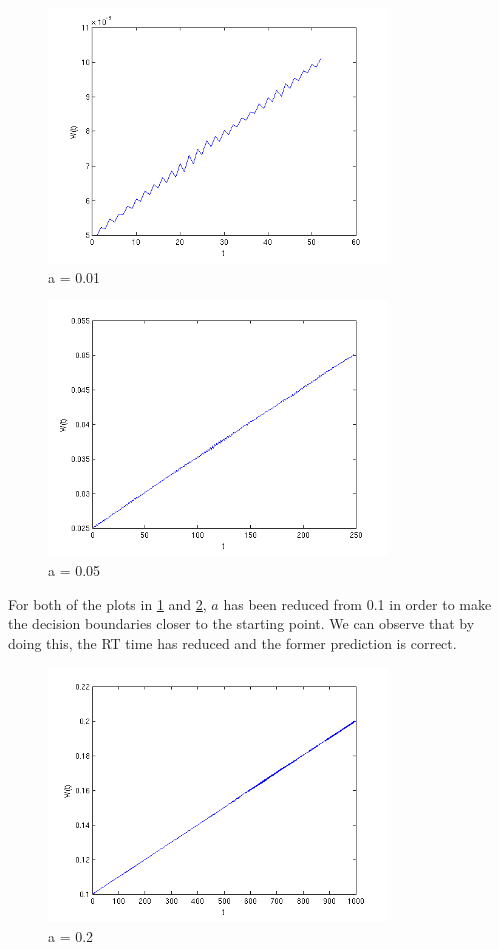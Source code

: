 \documentclass[11pt, twocolumn]{report}
\begin{document}
\begin{figure}[H]
\centering
\includegraphics[width=90mm]{assignment2_images/p1_3_1a.png}
\caption{a = 0.01}
\label{p1_1_3}
\end{figure}

\begin{figure}[H]
\centering
\includegraphics[width=90mm]{assignment2_images/p1_3_2a.png}
\caption{a = 0.05}
\label{p1_1_6}
\end{figure}

For both of the plots in \ref{p1_1_3} and \ref{p1_1_6}, $a$ has been reduced from 0.1 in order to make the decision boundaries closer to the starting point. We can observe that by doing this, the RT time has reduced and the former prediction is correct.

\begin{figure}[H]
\centering
\includegraphics[width=90mm]{assignment2_images/p1_3_3a.png}
\caption{a = 0.2}
\label{p1_1_8}
\end{figure}
\end{document}
